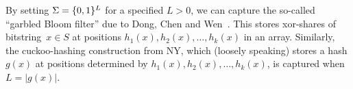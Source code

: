 By setting $\Sigma=\{0,1\}^L$ for a specified $L>0$, we can capture
the so-called ``garbled Bloom filter'' due to Dong, Chen and
Wen~\cite{xxx}.  This stores
xor-shares of bitstring~$x \in S$ at positions
$h_1(x),h_2(x),\ldots,h_k(x)$ in an array. Similarly, the
cuckoo-hashing construction from NY, which (loosely speaking) stores
a hash $g(x)$ at positions determined by
$h_1(x),h_2(x),\ldots,h_k(x)$, is captured when $L=|g(x)|$.
